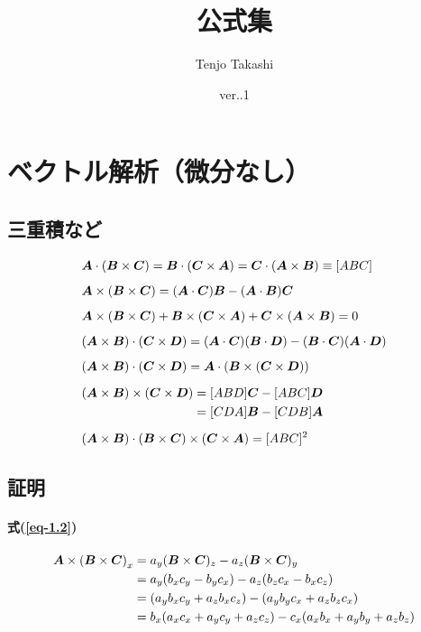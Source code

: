 \documentclass[a4paper,uplatex,dvi=dvipdfmx,ja=standard]{bxjsarticle}
\newcommand{\bm}[1]{{\mbox{\boldmath $#1$}}}
\numberwithin{equation}{section}
\begin{document}
\title{公式集}
\author{Tenjo Takashi}
\date{ver..1}
\maketitle
\tableofcontents

\section{ベクトル解析（微分なし）}
\subsection{三重積など}
\begin{align}
  & \bm{A}\cdot(\bm{B}\times\bm{C})=\bm{B}\cdot(\bm{C}\times\bm{A})=\bm{C}\cdot(\bm{A}\times\bm{B})\equiv[ABC] \label{eq-1.1} \\[0.5em]
  & \bm{A}\times(\bm{B}\times\bm{C})=(\bm{A}\cdot\bm{C})\bm{B}-(\bm{A}\cdot\bm{B})\bm{C} \label{eq-1.2} \\[0.5em]
  & \bm{A}\times(\bm{B}\times\bm{C})+\bm{B}\times(\bm{C}\times\bm{A})+\bm{C}\times(\bm{A}\times\bm{B})=0 \label{eq-1.3} \\[0.5em]
  & (\bm{A}\times\bm{B})\cdot(\bm{C}\times\bm{D})=(\bm{A}\cdot\bm{C})(\bm{B}\cdot\bm{D})-(\bm{B}\cdot\bm{C})(\bm{A}\cdot\bm{D}) \label{eq-1.4} \\[0.5em]
  & (\bm{A}\times\bm{B})\cdot(\bm{C}\times\bm{D})=\bm{A}\cdot(\bm{B}\times(\bm{C}\times\bm{D})) \label{eq-1.5} \\[0.5em]
  &\begin{aligned}
    (\bm{A}\times\bm{B})\times(\bm{C}\times\bm{D})&=[ABD]\bm{C}-[ABC]\bm{D} \\
    & =[CDA]\bm{B}-[CDB]\bm{A}
  \end{aligned} \label{eq-1.6} \\[0.5em]
  & (\bm{A}\times\bm{B})\cdot(\bm{B}\times\bm{C})\times(\bm{C}\times\bm{A})=[ABC]^2 \label{eq-1.7}
\end{align}

\subsection{証明}
\paragraph{式(\ref{eq-1.2})}
\begin{align*}
  {\bm{A}\times(\bm{B}\times\bm{C})}_x&=a_y(\bm{B}\times\bm{C})_z-a_z(\bm{B}\times\bm{C})_y \\
  &= a_y(b_xc_y-b_yc_x)-a_z(b_zc_x-b_xc_z) \\
  &= (a_yb_xc_y+a_zb_xc_z)-(a_yb_yc_x+a_zb_zc_x) \\
  &= b_x(a_xc_x+a_yc_y+a_zc_z)-c_x(a_xb_x+a_yb_y+a_zb_z)
\end{align*}
\end{document}
